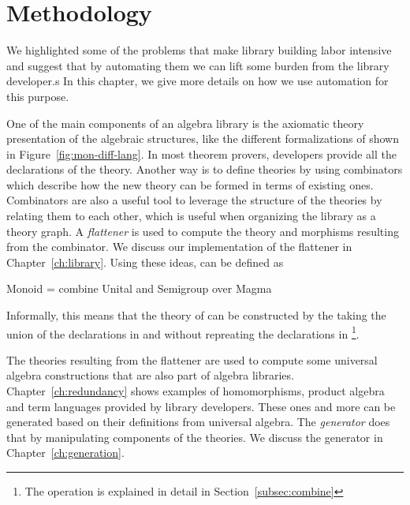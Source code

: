 \chapter{Methodology}
\label{ch:design}

We highlighted some of the problems that make library building labor intensive and suggest that by automating them we can lift some burden from the library developer.s In this chapter, we give more details on how we use automation for this purpose. 

One of the main components of an algebra library is the axiomatic theory presentation of the algebraic structures, like the different formalizations of  shown in Figure~\ref{fig:mon-diff-lang}. In most theorem provers, developers provide all the declarations of the theory. Another way is to define theories by using combinators which describe how the new theory can be formed in terms of existing ones. 
Combinators are also a useful tool to leverage the structure of the theories by relating them to each other, which is useful when organizing the library as a theory graph. A \emph{flattener} is used to compute the theory and morphisms resulting from the combinator. We discuss our implementation of the flattener in Chapter~\ref{ch:library}. Using these ideas,  can be defined as 
\begin{togcode} 
Monoid = combine Unital and Semigroup over Magma
\end{togcode} 
Informally, this means that the theory of  can be constructed by the taking the union of the declarations in   and  without repreating the declarations in \footnote{The  operation is explained in detail in Section~\ref{subsec:combine}}. 

The theories resulting from the flattener are used to compute some universal algebra constructions that are also part of algebra libraries. Chapter~\ref{ch:redundancy} shows examples of homomorphisms, product algebra and term languages provided by library developers. These ones and more can be generated based on their definitions from universal algebra. The \emph{generator} does that by manipulating components of the theories. We discuss the generator in Chapter~\ref{ch:generation}. 

